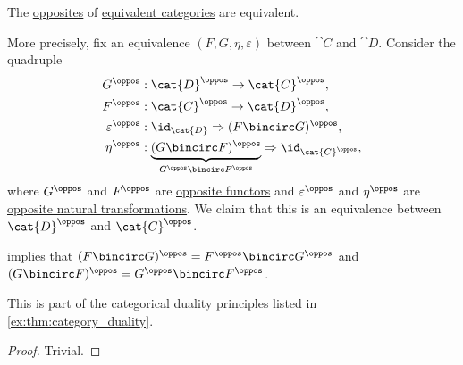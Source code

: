 \begin{proposition}\label{thm:opposite_of_category_equivalence}
  The \hyperref[def:opposite_category]{opposites} of \hyperref[def:equivalence_of_categories]{equivalent categories} are equivalent.

  More precisely, fix an equivalence \( (F, G, \eta, \varepsilon) \) between \( \cat{C} \) and \( \cat{D} \). Consider the quadruple
  \begin{equation*}
    \begin{aligned}
                G^\oppos &: \cat{D}^\oppos \to \cat{C}^\oppos, \\
                F^\oppos &: \cat{C}^\oppos \to \cat{D}^\oppos, \\
      \varepsilon^\oppos &: \id_{\cat{D}} \Rightarrow (F \bincirc G)^\oppos, \\
             \eta^\oppos &: \underbrace{(G \bincirc F)^\oppos}_{G^\oppos \bincirc F^\oppos} \Rightarrow \id_{\cat{C}^\oppos},
    \end{aligned}
  \end{equation*}
  where \( G^\oppos \) and \( F^\oppos \) are \hyperref[def:opposite_functor]{opposite functors} and \( \varepsilon^\oppos \) and \( \eta^\oppos \) are \hyperref[def:opposite_natural_transformation]{opposite natural transformations}. We claim that this is an equivalence between \( \cat{D}^\oppos \) and \( \cat{C}^\oppos \).
\end{proposition}
\begin{comments}
  \item {} implies that \( (F \bincirc G)^\oppos = F^\oppos \bincirc G^\oppos \) and \( (G \bincirc F)^\oppos = G^\oppos \bincirc F^\oppos \).

  \item This is part of the categorical duality principles listed in \cref{ex:thm:category_duality}.
\end{comments}
\begin{proof}
  Trivial.
\end{proof}

